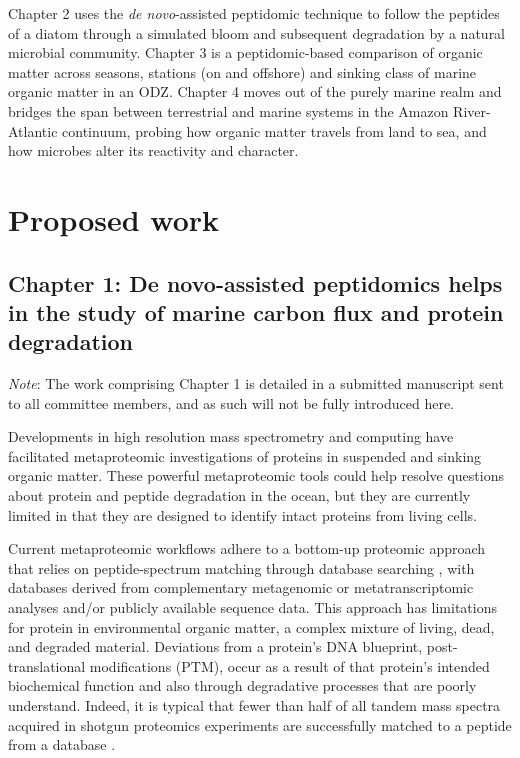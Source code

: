 \documentclass[12pt, letterpaper, twoside]{article}
\begin{document}
Chapter 2 uses the \textit{de novo}-assisted peptidomic technique to follow the peptides of a diatom through a simulated bloom and subsequent degradation by a natural microbial community. Chapter 3 is a peptidomic-based comparison of organic matter across seasons, stations (on and offshore) and sinking class of marine organic matter in an ODZ. Chapter 4 moves out of the purely marine realm and bridges the span between terrestrial and marine systems in the Amazon River-Atlantic continuum, probing how organic matter travels from land to sea, and how microbes alter its reactivity and character.

\newpage

\section{Proposed work}

\subsection{{Chapter 1: De novo}-assisted peptidomics helps in the study of marine carbon flux and protein degradation}

\textit{Note}: The work comprising Chapter 1 is detailed in a submitted manuscript sent to all committee members, and as such will not be fully introduced here. 

Developments in high resolution mass spectrometry and computing have facilitated metaproteomic investigations of proteins in suspended \cite{dong_characterization_2010, bridoux_suspended_2015, bergauer_organic_2017} and sinking \cite{moore_identifying_2012} organic matter. These powerful metaproteomic tools could help resolve questions about protein and peptide degradation in the ocean, but they are currently limited in that they are designed to identify intact proteins from living cells.

Current metaproteomic workflows adhere to a bottom-up proteomic approach that relies on peptide-spectrum matching through database searching \cite{saito_progress_2019}, with databases derived from  complementary metagenomic or metatranscriptomic analyses and/or publicly available sequence data. This approach has limitations for protein in environmental organic matter, a complex mixture of living, dead, and degraded material. Deviations from a protein's DNA blueprint, post-translational modifications (PTM), occur as a result of that protein’s intended biochemical function and also through degradative processes \cite{kim_methionine_2014} that are poorly understand. Indeed, it is typical that fewer than half of all tandem mass spectra acquired in shotgun proteomics experiments are successfully matched to a peptide from a database \cite{chick_mass-tolerant_2015}. 
\end{document}
